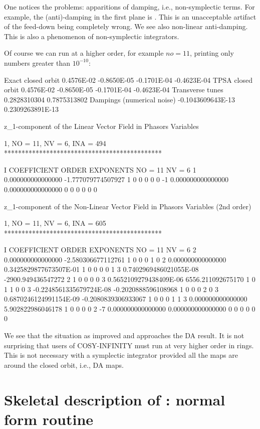 \documentclass{hitec}     %
\newcommand{\Section}[1]{\section{#1}\vspace*{-1ex}}
\begin{document}
{{{{{{ 
 One notices the problems: apparitions of damping, i.e., non-symplectic terms. For example, the (anti)-damping in the first plane is . This is an unacceptable artifact of the feed-down being completely wrong. We see also non-linear anti-damping. This is also a phenomenon of non-symplectic integrators.
 
 
 Of course we can run at a higher order, for example $no=11$, printing only numbers greater than $10^{-10}$:
 
 \begin{code}
Exact closed orbit  0.4576E-02 -0.8650E-05 -0.1701E-04 -0.4623E-04
TPSA  closed orbit  0.4576E-02 -0.8650E-05 -0.1701E-04 -0.4623E-04
 Transverse tunes
  0.2828310304       0.7875313802
 Dampings (numerical noise)
 -0.1043609643E-13   0.2309263891E-13

 z_1-component of the Linear Vector Field in Phasors Variables

          1, NO =   11, NV =    6, INA =  494
 *********************************************

    I  COEFFICIENT          ORDER   EXPONENTS
      NO =    11      NV =     6
   1   0.000000000000000      -1.777079774507927       1  0  0  0  0  0
    -1   0.000000000000000       0.000000000000000       0  0  0  0  0  0

 z_1-component of the Non-Linear Vector Field in Phasors Variables (2nd order)

          1, NO =   11, NV =    6, INA =  605
 *********************************************

    I  COEFFICIENT          ORDER   EXPONENTS
      NO =    11      NV =     6
   2   0.000000000000000      -2.580306677112761       1  0  0  0  1  0
   2   0.000000000000000      0.3425829877673507E-01   1  0  0  0  0  1
   3  0.7402969486021055E-08  -2900.949436547272       2  1  0  0  0  0
   3  0.5652109279438409E-06   6556.211092675170       1  0  1  1  0  0
   3 -0.2248561335679724E-08 -0.2020888596108968       1  0  0  0  2  0
   3  0.6870246124991154E-09 -0.2080839306933067       1  0  0  0  1  1
   3   0.000000000000000       5.902822986046178       1  0  0  0  0  2
    -7   0.000000000000000       0.000000000000000       0  0  0  0  0  0
 \end{code}
  \renewcommand{\codefont}{\small}
  
 We see that the situation as improved and approaches the DA result.     It is not surprising that users of COSY-INFINITY must run at very higher order in rings. This is not necessary with a symplectic integrator provided all the maps are around the closed orbit, i.e., DA maps.
\Section{Skeletal description of : normal form routine}
\label{s:cnormal}

}}}}}}
\end{document}
